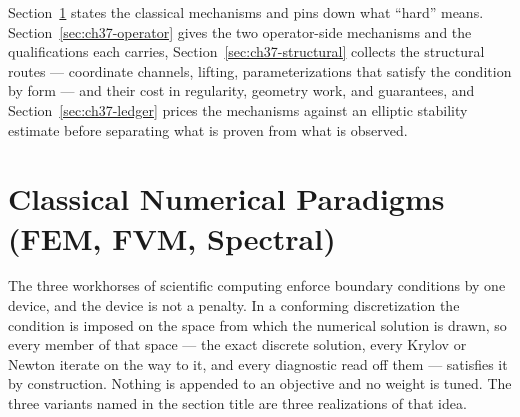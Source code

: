 Section~\ref{sec:ch37-classical} states the classical mechanisms and pins down what ``hard'' means.
Section~\ref{sec:ch37-operator} gives the two operator-side mechanisms and the
qualifications each carries, Section~\ref{sec:ch37-structural} collects the structural
routes --- coordinate channels, lifting, parameterizations that satisfy the condition by
form --- and their cost in regularity, geometry work, and guarantees, and Section~\ref{sec:ch37-ledger}
prices the mechanisms
against an elliptic stability estimate before separating what is proven from what is observed.

\section{Classical Numerical Paradigms (FEM, FVM, Spectral)}
\label{sec:ch37-classical}

The three workhorses of scientific computing enforce boundary conditions by one device, and the
device is not a penalty. In a conforming discretization the condition is imposed on the space from
which the numerical solution is drawn, so every member of that space --- the exact discrete solution,
every Krylov or Newton iterate on the way to it, and every diagnostic read off them --- satisfies it
by construction. Nothing is appended to an objective and no weight is tuned. The three variants
named in the section title are three realizations of that idea.

